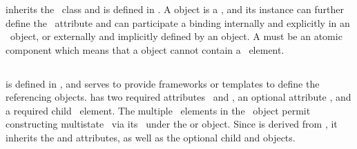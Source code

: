 
\subsubsection{}
\label{def:BindingSiteSpeciesType}

 inherits the \SpeciesType\ class and is defined in . A  object is a , \mBlockChangedBegin{\revTwentyTwentyMarch} and its\mBlockChangedEnd{\revTwentyTwentyMarch} instance can further define the \bindingStatusAtt\ attribute and can participate a binding internally and explicitly in an \InSpeciesTypeBond\ object, or externally and implicitly defined by an \OutwardBindingSite object. A  must be an atomic component which means that a  object cannot contain a \ListOfSpeciesTypeInstances\ \mBlockChangedBegin{\revTwentyTwentyMarch}element\mBlockChangedEnd{\revTwentyTwentyMarch}.

\label{def:OneToOneBinding}


\subsection{}
\label{def:SpeciesFeatureType}

 is defined in , and serves to provide frameworks or templates to define the referencing \SpeciesFeature objects.  has two required attributes \idAtt\ and \occurAtt, an optional attribute \nameAtt,  and a required child \mBlockChangedBegin{\revTwentyTwentyMarch}\ListOfPossibleSpeciesFeatureValues\ element\mBlockChangedEnd{\revTwentyTwentyMarch}. The multiple \mBlockChangedBegin{\revTwentyTwentyMarch} \PossibleSpeciesFeatureValue\ elements in\mBlockChangedEnd{\revTwentyTwentyMarch} the \ListOfPossibleSpeciesFeatureValues\ object permit constructing multistate \species\ via its \speciesFeatures\ under the \ListOfSpeciesFeatures or \SubListOfSpeciesFeatures object. Since  is derived from , it inherits the  and  attributes, as well as the optional \mBlockChangedBegin{\revTwentyTwentyMarch}child\mBlockChangedEnd{\revTwentyTwentyMarch}  and  objects. 

